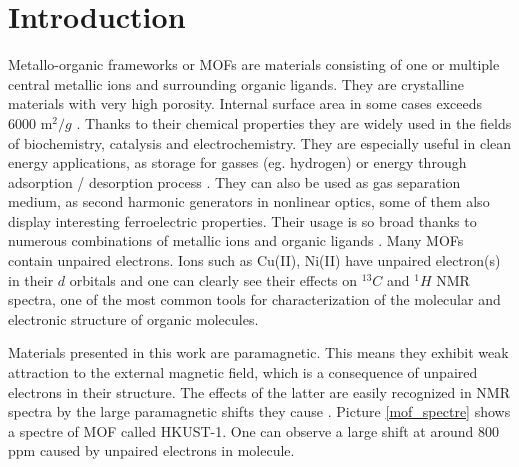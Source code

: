 \documentclass[openany, longbibliography,slovene,a4paper,12pt]{article}
\begin{document}
%


\section{Introduction}

Metallo-organic frameworks or MOFs are materials consisting of one or multiple
central metallic ions and surrounding organic ligands.  They are crystalline
materials with very high porosity. Internal surface area in some cases exceeds
6000 $\mathrm{m}^2/{g}$ \cite{introd_to_metal_organ_frameworks}. Thanks to their
chemical properties they are widely used in the fields of biochemistry,
catalysis and electrochemistry. They are especially useful in clean energy
applications, as storage for gasses (eg. hydrogen) or energy through
adsorption / desorption process \cite{introd_to_metal_organ_frameworks}. They can
also be used as gas separation medium, as second harmonic generators in
nonlinear optics, some of them also display interesting ferroelectric
properties. Their usage is so broad thanks to numerous combinations of metallic
ions and organic ligands  \cite{introd_to_metal_organ_frameworks,
  Assignment_of_Solid_State}. Many MOFs contain unpaired electrons. Ions such as Cu(II), Ni(II) have unpaired electron(s) in their $d$ orbitals and one can clearly see their
 effects on $^{13}C$ and $^{1}H$ NMR  spectra, one of the most common tools for
 characterization of the molecular and electronic structure of organic
 molecules.

 Materials presented in this work are paramagnetic. This means they exhibit weak
 attraction to the external magnetic field, which is a consequence of unpaired
 electrons in their structure. The effects of the latter are easily recognized
 in NMR spectra by the large paramagnetic shifts they cause
 \cite{Dft_Investigation_of_the_Effect_of_Spin_Orbit}. Picture \ref{mof_spectre}
 shows a spectre of MOF called HKUST-1. One can observe a large shift at around
 800 ppm caused by unpaired electrons in molecule.
\end{document}
